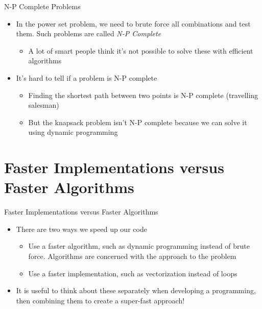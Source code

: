 \documentclass[
  ignorenonframetext,
]{beamer}
\providecommand{\tightlist}{%
  \setlength{\itemsep}{0pt}\setlength{\parskip}{0pt}}\usepackage{longtable,booktabs,array}
\begin{document}
\begin{frame}{N-P Complete Problems}
\protect\hypertarget{n-p-complete-problems}{}
\begin{itemize}
\item
  In the power set problem, we need to brute force all combinations and
  test them. Such problems are called \emph{N-P Complete}

  \begin{itemize}
  \tightlist
  \item
    A lot of smart people think it's not possible to solve these with
    efficient algorithms
  \end{itemize}
\item
  It's hard to tell if a problem is N-P complete

  \begin{itemize}
  \item
    Finding the shortest path between two points is N-P complete
    (travelling salesman)
  \item
    But the knapsack problem isn't N-P complete because we can solve it
    using dynamic programming
  \end{itemize}
\end{itemize}
\end{frame}

\hypertarget{faster-implementations-versus-faster-algorithms}{%
\section{Faster Implementations versus Faster
Algorithms}\label{faster-implementations-versus-faster-algorithms}}

\begin{frame}{Faster Implementations versus Faster Algorithms}
\protect\hypertarget{faster-implementations-versus-faster-algorithms-1}{}
\begin{itemize}
\item
  There are two ways we speed up our code

  \begin{itemize}
  \item
    Use a faster algorithm, such as dynamic programming instead of brute
    force. Algorithms are concerned with the approach to the problem
  \item
    Use a faster implementation, such as vectorization instead of loops
  \end{itemize}
\item
  It is useful to think about these separately when developing a
  programming, then combining them to create a super-fast approach!
\end{itemize}
\end{frame}
\end{document}

